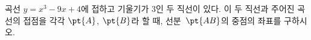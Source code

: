 곡선 $y=x^3-9x+4$에 접하고 기울기가 $3$인 두 직선이 있다. 이 두 직선과 주어진 곡선의 접점을 각각 $\pt{A}$, $\pt{B}$라 할 때, 선분~$\pt{AB}$의 중점의 좌표를 구하시오.
